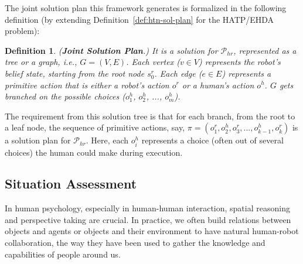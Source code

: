 \documentclass[letterpaper]{article} %
\newtheorem{definition}{Definition}
\begin{document}
The joint solution plan this framework generates is formalized in the following definition (by extending Definition~\ref{def:htn-sol-plan} for the HATP/EHDA problem):
\begin{definition}
(\textbf{Joint Solution Plan}.) 
{It is a solution for $\mathcal{P}_{hr}$, represented as a tree or a graph, i.e., $G=(V,E)$. Each vertex ($v \in V$) represents the robot's belief state, starting from the root node $s_0^r$. Each edge ($e \in E$) represents a primitive action that is either a robot's action $o^{r}$ or a human's action $o^{h}$. $G$ gets branched on the possible choices ($o^{h}_1$, $o^{h}_2$, ..., $o^{h}_m$). 
}  
\end{definition}

The requirement from this solution tree is that for each branch, from the root to a leaf node, the sequence of primitive actions, say,  $\pi=(o_1^r,o_2^h,o_3^r,...,o_{k-1}^h,o_k^r)$ is a solution plan for
$\mathcal{P}_{hr}$. 
Here, each $o_i^h$ represents a choice (often out of several choices) the human could make during execution.

\subsection{Situation Assessment} In human psychology, especially in human-human interaction, spatial reasoning and perspective taking are crucial. 
In practice, we often build relations between objects and agents or objects and their environment to have natural human-robot collaboration, the way they have been used to gather the knowledge and capabilities of people around us. 

\end{document}
